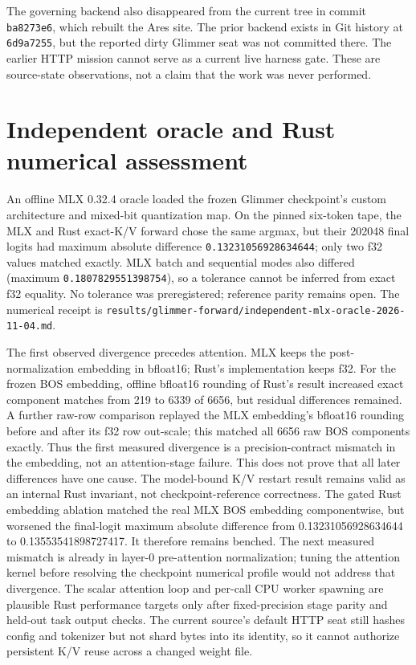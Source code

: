 \documentclass{article}
\begin{document}
The governing backend also disappeared from the current tree in commit
\texttt{ba8273e6}, which rebuilt the Ares site. The prior backend exists in
Git history at \texttt{6d9a7255}, but the reported dirty Glimmer seat was
not committed there. The earlier HTTP mission cannot serve as a current live
harness gate. These are source-state observations, not a claim that the work
was never performed.
\section*{Independent oracle and Rust numerical assessment}
An offline MLX 0.32.4 oracle loaded the frozen Glimmer checkpoint's custom
architecture and mixed-bit quantization map. On the pinned six-token tape,
the MLX and Rust exact-K/V forward chose the same argmax, but their 202048
final logits had maximum absolute difference
\texttt{0.13231056928634644}; only two f32 values matched exactly. MLX
batch and sequential modes also differed (maximum
\texttt{0.1807829551398754}), so a tolerance cannot be inferred from exact
f32 equality. No tolerance was preregistered; reference parity remains open.
The numerical receipt is
\texttt{results/glimmer-forward/independent-mlx-oracle-2026-11-04.md}.

The first observed divergence precedes attention. MLX keeps the
post-normalization embedding in bfloat16; Rust's implementation keeps f32.
For the frozen BOS embedding, offline bfloat16 rounding of Rust's result
increased exact component matches from 219 to 6339 of 6656, but residual
differences remained. A further raw-row comparison replayed the MLX
embedding's bfloat16 rounding before and after its f32 row out-scale; this
matched all 6656 raw BOS components exactly. Thus the first measured
divergence is a precision-contract mismatch in the embedding, not an
attention-stage failure. This does not prove that all later differences have
one cause. The model-bound K/V restart result remains
valid as an internal Rust invariant, not checkpoint-reference correctness.
The gated Rust embedding ablation matched the real MLX BOS embedding
componentwise, but worsened the final-logit maximum absolute difference
from 0.13231056928634644 to 0.13553541898727417. It therefore remains
benched. The next measured mismatch is already in layer-0 pre-attention
normalization; tuning the attention kernel before resolving the checkpoint
numerical profile would not address that divergence.
The scalar attention loop and per-call CPU worker spawning are plausible Rust
performance targets only after fixed-precision stage parity and held-out
task output checks. The current source's default HTTP seat still hashes
config and tokenizer but not shard bytes into its identity, so it cannot
authorize persistent K/V reuse across a changed weight file.
\end{document}
